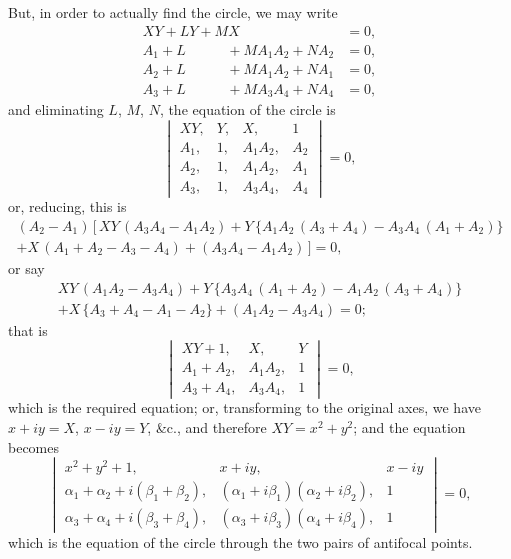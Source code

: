 \documentclass[11pt,a4paper]{article}
\begin{document}
But, in order to actually find the circle, we may write
\begin{align*}
XY + LY + MX \phantom{+N\;} &= 0,\\
A_1 + L \phantom{+MA_1} + MA_1A_2 + NA_2 &= 0,\\
A_2 + L \phantom{+MA_2} + MA_1A_2 + NA_1 &= 0,\\
A_3 + L \phantom{+MA_3} + MA_3A_4 + NA_4 &= 0,
\end{align*}
and eliminating $L$, $M$, $N$, the equation of the circle is
\[
\begin{vmatrix}
XY, & Y, & X, & 1 \\
A_1, & 1, & A_1A_2, & A_2 \\
A_2, & 1, & A_1A_2, & A_1 \\
A_3, & 1, & A_3A_4, & A_4
\end{vmatrix} = 0,
\]
or, reducing, this is
\begin{multline*}
(A_2-A_1)\,[\,XY\,(A_3A_4 - A_1A_2) + Y\,\{A_1A_2\,(A_3+A_4) - A_3A_4\,(A_1+A_2)\}\\
+ X\,(A_1+A_2-A_3-A_4) + (A_3A_4 - A_1A_2)\,] = 0,
\end{multline*}
or say
\begin{multline*}
XY\,(A_1A_2 - A_3A_4) + Y\,\{A_3A_4\,(A_1+A_2) - A_1A_2\,(A_3+A_4)\}\\
+ X\,\{A_3+A_4-A_1-A_2\} + (A_1A_2 - A_3A_4) = 0;
\end{multline*}
that is
\[
\begin{vmatrix}
XY+1, & X, & Y \\
A_1+A_2, & A_1A_2, & 1 \\
A_3+A_4, & A_3A_4, & 1
\end{vmatrix} = 0,
\]
which is the required equation; or, transforming to the original axes, we have $x+iy=X$,
$x-iy=Y$, \&c., and therefore $XY=x^2+y^2$; and the equation becomes
\[
\begin{vmatrix}
x^2+y^2+1, & x+iy, & x-iy \\
\alpha_1+\alpha_2+i(\beta_1+\beta_2), & (\alpha_1+i\beta_1)(\alpha_2+i\beta_2), & 1 \\
\alpha_3+\alpha_4+i(\beta_3+\beta_4), & (\alpha_3+i\beta_3)(\alpha_4+i\beta_4), & 1
\end{vmatrix} = 0,
\]
which is the equation of the circle through the two pairs of antifocal points.
\end{document}
